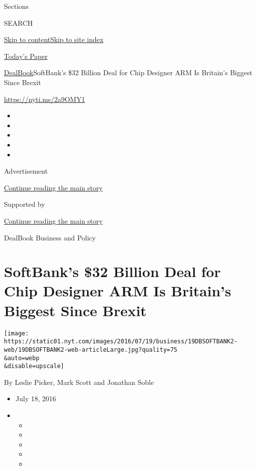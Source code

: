 Sections

SEARCH

\protect\hyperlink{site-content}{Skip to
content}\protect\hyperlink{site-index}{Skip to site index}

\href{https://myaccount.nytimes.com/auth/login?response_type=cookie\&client_id=vi}{}

\href{https://www.nytimes.com/section/todayspaper}{Today's Paper}

\href{/section/business/dealbook}{DealBook}\textbar{}SoftBank's \$32
Billion Deal for Chip Designer ARM Is Britain's Biggest Since Brexit

\url{https://nyti.ms/2a9OMY1}

\begin{itemize}
\item
\item
\item
\item
\item
\end{itemize}

Advertisement

\protect\hyperlink{after-top}{Continue reading the main story}

Supported by

\protect\hyperlink{after-sponsor}{Continue reading the main story}

DealBook Business and Policy

\hypertarget{softbanks-32-billion-deal-for-chip-designer-arm-is-britains-biggest-since-brexit}{%
\section{SoftBank's \$32 Billion Deal for Chip Designer ARM Is Britain's
Biggest Since
Brexit}\label{softbanks-32-billion-deal-for-chip-designer-arm-is-britains-biggest-since-brexit}}

\texttt{[image: https://static01.nyt.com/images/2016/07/19/business/19DBSOFTBANK2-web/19DBSOFTBANK2-web-articleLarge.jpg?quality=75\\\&auto=webp\\\&disable=upscale]}

By Leslie Picker, Mark Scott and Jonathan Soble

\begin{itemize}
\item
  July 18, 2016
\item
  \begin{itemize}
  \item
  \item
  \item
  \item
  \item
  \end{itemize}
\end{itemize}


